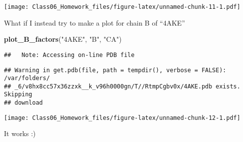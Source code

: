 \documentclass[]{article}
\newenvironment{Shaded}{\begin{snugshade}}{\end{snugshade}}
\newcommand{\KeywordTok}[1]{\textcolor[rgb]{0.13,0.29,0.53}{\textbf{{#1}}}}
\newcommand{\StringTok}[1]{\textcolor[rgb]{0.31,0.60,0.02}{{#1}}}
\newcommand{\NormalTok}[1]{{#1}}
\begin{document}
\texttt{[image: Class06\_Homework\_files/figure-latex/unnamed-chunk-11-1.pdf]}

What if I instead try to make a plot for chain B of ``4AKE''

\begin{Shaded}
\begin{Highlighting}[]
\KeywordTok{plot_B_factors}\NormalTok{(}\StringTok{"4AKE"}\NormalTok{, }\StringTok{"B"}\NormalTok{, }\StringTok{"CA"}\NormalTok{)}
\end{Highlighting}
\end{Shaded}

\begin{verbatim}
##   Note: Accessing on-line PDB file
\end{verbatim}

\begin{verbatim}
## Warning in get.pdb(file, path = tempdir(), verbose = FALSE): /var/folders/
## _6/v8hx8cc57x36zzxk__k_v96h0000gn/T//RtmpCgbv0x/4AKE.pdb exists. Skipping
## download
\end{verbatim}

\texttt{[image: Class06\_Homework\_files/figure-latex/unnamed-chunk-12-1.pdf]}

It works :)
\end{document}
